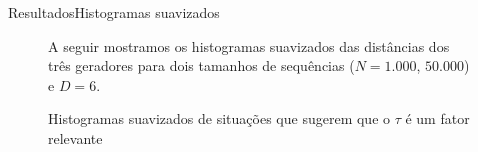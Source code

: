 \documentclass[10pt,xcolor={dvipsnames}]{beamer}
\begin{document}
\begin{frame}{Resultados}{Histogramas suavizados}
\begin{block}{}
\begin{figure} %
	A seguir mostramos os histogramas suavizados das distâncias dos três geradores para dois tamanhos de sequências ($N=1.000$, $50.000$) e $D=6$.
	\centering
	\caption{Histogramas suavizados de situações que sugerem que o $\tau$ é um fator relevante}\label{fig:tRelevante}
\end{figure}	
\end{block}
\end{frame}
\end{document}
